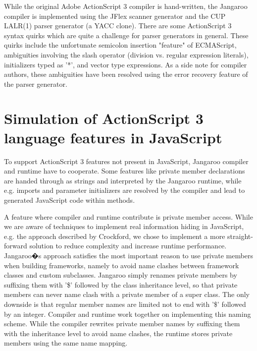 \documentclass[10pt]{sigplanconf}
\begin{document}





While the original Adobe ActionScript 3 compiler is hand-written, the Jangaroo compiler is implemented using the JFlex scanner generator\citep{jflex} and the CUP LALR(1) parser generator\citep{cup} (a YACC clone). There are some ActionScript 3 syntax quirks which are quite a challenge for parser generators in general. These quirks include the unfortunate semicolon insertion "feature" of ECMAScript, ambiguities involving the slash operator (division vs. regular expression literals), initializers typed as '*', and vector type expressions. As a side note for compiler authors, these ambiguities have been resolved using the error recovery feature of the parser generator.

\section{Simulation of ActionScript 3 language features in JavaScript}

To support ActionScript 3 features not present in Java\-Script, Jangaroo compiler and runtime have to co\-operate. Some features like private member declarations are handed through as strings and interpreted by the Jangaroo runtime, while e.g. imports and parameter initializers are resolved by the compiler and lead to generated JavaScript code within methods.

A feature where compiler and runtime contribute is private member access. While we are aware of techniques to implement real information hiding in JavaScript, e.g. the approach described by Crock\-ford\citep{Crockford2001-private.members}, we chose to implement a more straight-forward solution to reduce complexity and increase runtime performance. Jangaroo�s approach satisfies the most important reason to use private members when building frameworks, namely to avoid name clashes between framework classes and custom subclasses. Jangaroo simply renames private members by suffixing them with '\$' followed by the class inheritance level, so that private members can never name clash with a private member of a super class. The only downside is that regular member names are limited not to end with '\$' followed by an integer. Compiler and runtime work together on implementing this naming scheme. While the compiler rewrites private member names by suffixing them with the inheritance level to avoid name clashes, the runtime stores private members using the same name mapping.
\end{document}
